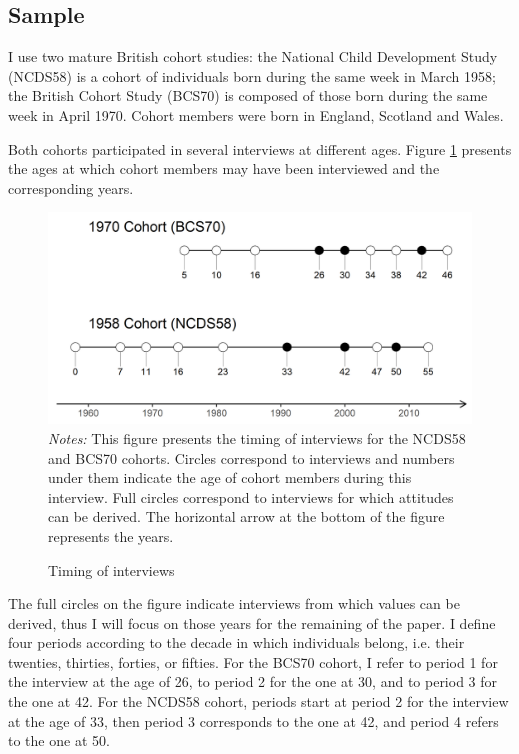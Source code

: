 \subsection{Sample}

I use two mature British cohort studies: the National Child Development Study (NCDS58) is a cohort of individuals born during the same week in March 1958; the British Cohort Study (BCS70) is composed of those born during the same week in April 1970. 
Cohort members were born in England, Scotland and Wales.

Both cohorts participated in several interviews at different ages.
Figure \ref{chap3-fig:data-itw-values} presents the ages at which cohort members may have been interviewed and the corresponding years.
\begin{figure}[!tb]
    \centering
    \caption{Timing of interviews}
    \label{chap3-fig:data-itw-values}
    \includegraphics[width=\linewidth]{chap3/graphic/data-itw-values.png}
    \hrulefill
	\vspace{-3em}
	\justify\singlespacing\footnotesize{\textit{Notes:} This figure presents the timing of interviews for the NCDS58 and BCS70 cohorts. Circles correspond to interviews and numbers under them indicate the age of cohort members during this interview. Full circles correspond to interviews for which attitudes can be derived. The horizontal arrow at the bottom of the figure represents the years.}
\end{figure}
The full circles on the figure indicate interviews from which values can be derived, thus I will focus on those years for the remaining of the paper.
I define four periods according to the decade in which individuals belong, i.e. their twenties, thirties, forties, or fifties.
For the BCS70 cohort, I refer to period 1 for the interview at the age of 26, to period 2 for the one at 30, and to period 3 for the one at 42.
For the NCDS58 cohort, periods start at period 2 for the interview at the age of 33, then period 3 corresponds to the one at 42, and period 4 refers to the one at 50.

